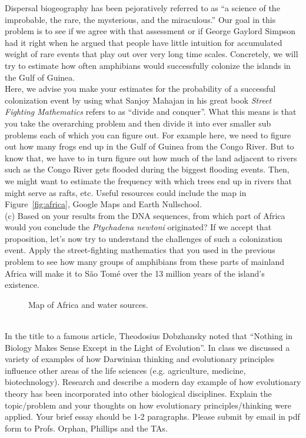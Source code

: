 \documentclass[12pt]{article}    %
\begin{document}
Dispersal biogeography has been pejoratively referred to as ``a science of the
improbable, the rare, the mysterious, and the miraculous.'' Our goal in this
problem is to see if we agree with that assessment or if George Gaylord Simpson
had it right when he argued that people have little intuition for accumulated
weight of rare events that play out over very long time scales. Concretely, we
will try to estimate how often amphibians would successfully colonize the
islands in the Gulf of Guinea.\\

Here, we advise you make your estimates for the probability of a successful
colonization event by using what Sanjoy Mahajan in his great book {\it Street
Fighting Mathematics} refers to as ``divide and conquer''.  What this means is
that you take the overarching problem and then divide it into ever smaller sub
problems each of which you can figure out.  For example here, we need to figure
out how many frogs end up in the Gulf of Guinea from the Congo River.  But to
know that, we have to in turn figure out how much of the land adjacent to rivers
such as the Congo River gets flooded during the biggest flooding events. Then,
we might want to estimate the frequency with which trees end up in rivers that
might serve as rafts, etc. Useful resources could include the map in
Figure~\ref{fig:africa},  Google Maps and Earth Nullschool.\\

(c) Based on your results from the DNA sequences, from which
part of Africa would you conclude the \emph{Ptychadena newtoni} originated? If
we accept that proposition, let's now try to understand the challenges of such a
colonization event. Apply the street-fighting mathematics that you used in the
previous problem to see how many groups of amphibians from these parts of
mainland Africa will make it to S\~ao Tom\'e over the 13 million years of the
island's existence.\\


\begin{figure}[h!]
	\caption{Map of Africa and water sources.}
	\label{fig:africa_water}
\end{figure}



\\

In the title to a famous article, Theodosius Dobzhansky noted that ``Nothing in Biology Makes Sense Except in the Light of Evolution''.  In class we discussed a variety of examples of how Darwinian thinking and evolutionary principles influence other areas of the life sciences (e.g. agriculture, medicine, biotechnology).  Research and describe a modern day example of how evolutionary theory has been incorporated into other biological disciplines.  Explain the topic/problem and your thoughts on how evolutionary principles/thinking were applied.  Your brief essay should be 1-2 paragraphs.  Please submit by email in pdf
form to Profs. Orphan, Phillips and the TAs.\\



    
\end{document}
